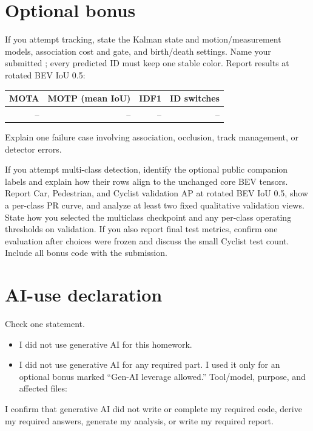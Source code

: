 \documentclass[11pt]{article}
\begin{document}
\section*{Optional bonus}
If you attempt tracking, state the Kalman state and motion/measurement models,
association cost and gate, and birth/death settings. Name your submitted
; every predicted ID must keep one stable color.
Report results at rotated BEV IoU 0.5:

\begin{center}
\begin{tabular}{@{}rrrr@{}}
\toprule
MOTA & MOTP (mean IoU) & IDF1 & ID switches \\
\midrule
-- & -- & -- & -- \\
\bottomrule
\end{tabular}
\end{center}

Explain one failure case involving association, occlusion, track management,
or detector errors.

If you attempt multi-class detection, identify the optional public companion
labels and explain how their rows align to the unchanged core BEV tensors.
Report Car, Pedestrian, and Cyclist validation AP at rotated BEV IoU 0.5,
show a per-class PR curve, and analyze at least two fixed qualitative
validation views. State how you selected the multiclass checkpoint and any
per-class operating thresholds on validation. If you also report final test
metrics, confirm one evaluation after choices were frozen and discuss the
small Cyclist test count. Include all bonus code with the submission.

\section*{AI-use declaration}
Check one statement.
\begin{itemize}
  \item[$\square$] I did not use generative AI for this homework.
  \item[$\square$] I did not use generative AI for any required part. I used it
  only for an optional bonus marked ``Gen-AI leverage allowed.'' Tool/model,
  purpose, and affected files: \underline{\hspace{1.4in}}
\end{itemize}
I confirm that generative AI did not write or complete my required code,
derive my required answers, generate my analysis, or write my required report.
\end{document}
